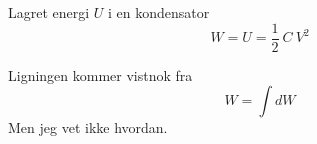 Lagret energi $U$ i en kondensator
$$W = U = \frac{1}{2}\ C\ V^2$$

Ligningen kommer vistnok fra
$$W = \int dW$$
Men jeg vet ikke hvordan.
